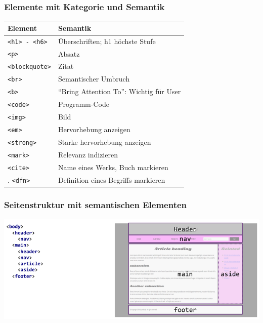 \documentclass[a4paper, landscape, 8pt]{scrartcl}
\begin{document}
\begin{multicols*}{4}
        \subsubsection{Elemente mit Kategorie und Semantik}
        \begin{tabularx}{\columnwidth}{l | X}
            \textbf{Element} & \textbf{Semantik} \\
            \hline
            \texttt{<h1> - <h6>} & Überschriften; h1 höchste Stufe\\
            \hline
            \texttt{<p>} & Absatz\\
            \hline
            \texttt{<blockquote>} & Zitat\\
            \hline
            \texttt{<br>} & Semantischer Umbruch\\
            \hline
            \texttt{<b>} & \enquote{Bring Attention To}: Wichtig für User\\
            \hline
            \texttt{<code>} & Programm-Code\\
            \hline
            \texttt{<img>} & Bild\\
            \hline
            \texttt{<em>} & Hervorhebung anzeigen\\
            \hline
            \texttt{<strong>} & Starke hervorhebung anzeigen\\
            \hline
            \texttt{<mark>} & Relevanz indizieren\\
            \hline
            \texttt{<cite>} & Name eines Werks, Buch markieren\\
            \hline.
            \texttt{<dfn>} & Definition eines Begriffs markieren
        \end{tabularx}

        \subsubsection{Seitenstruktur mit semantischen Elementen}
        \includegraphics[scale=0.25]{graphic/26-seitenstruktur-semantisch}


\end{multicols*}
\end{document}
